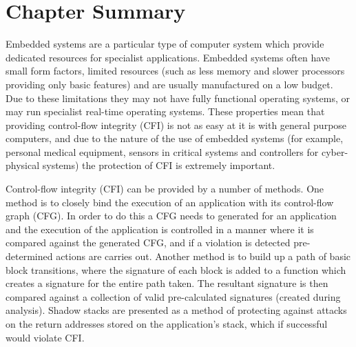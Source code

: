 \section{Chapter Summary}
Embedded systems are a particular type of computer system which provide dedicated resources for specialist applications. Embedded systems often have small form factors, limited resources (such as less memory and slower processors providing only basic features) and are usually manufactured on a low budget. Due to these limitations they may not have fully functional operating systems, or may run specialist real-time operating systems. These properties mean that providing control-flow integrity (CFI) is not as easy at it is with general purpose computers, and due to the nature of the use of embedded systems (for example, personal medical equipment, sensors in critical systems and controllers for cyber-physical systems) the protection of CFI is extremely important.

Control-flow integrity (CFI) can be provided by a number of methods. One method is to closely bind the execution of an application with its control-flow graph (CFG). In order to do this a CFG needs to generated for an application and the execution of the application is controlled in a manner where it is compared against the generated CFG, and if a violation is detected pre-determined actions are carries out. Another method is to build up a path of basic block transitions, where the signature of each block is added to a function which creates a signature for the entire path taken. The resultant signature is then compared against a collection of valid pre-calculated signatures (created during analysis). Shadow stacks are presented as a method of protecting against attacks on the return addresses stored on the application's stack, which if successful would violate CFI.